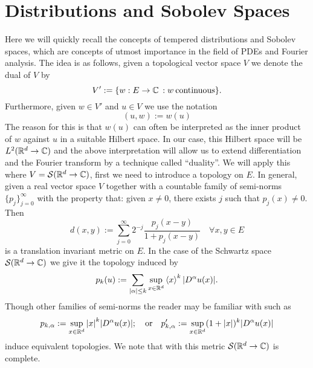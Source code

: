 \documentclass[12pt]{article}
\newcommand{\br}[1]{\left\langle#1\right\rangle}
\begin{document}
\section{Distributions and Sobolev Spaces}
Here we will quickly recall the concepts of tempered distributions and Sobolev spaces, which are concepts of utmost importance in the field of PDEs and Fourier analysis.
The idea is as follows, given a topological vector space $V$ we denote the dual of $V$  by \[V':=\lbrace w:E\to\mathbb{C}\hspace{2pt}: w \hspace{2pt}\text{continuous}\rbrace.\]
Furthermore, given $w\in V'$ and $u\in V$ we use the notation
\begin{equation*}
	(u,w):=w(u)
\end{equation*}
The reason for this is that $w(u)$ can often be interpreted as the inner product of $w$ against $u$ in a suitable Hilbert space. In our case, this Hilbert space will be $L^2({\mathbb R}^d\to\mathbb{C})$ and the above interpretation will allow us to extend differentiation and the Fourier transform by a technique called ``duality''.
\bigbreak  We will apply this where $V={\mathcal S}({\mathbb R}^d\to\mathbb{C})$, first we need to introduce a topology on $E$.
In general, given a real vector space $V$ together with a countable family of semi-norms $\lbrace p_j\rbrace_{j=0}^\infty$ with the property that: given $x\neq 0$, there exists $j$ such that $p_j(x)\neq 0$. Then
\begin{equation}\label{seminormsgivemetric}
	d(x,y):=\sum_{j=0}^\infty 2^{-j}\frac{p_j(x-y)}{1+p_j(x-y)}\quad \forall{x,y}\in {E}
\end{equation}
is a translation invariant metric on $E$. In the case of the Schwartz space ${\mathcal S}({\mathbb R}^d\to\mathbb{C})$ we give it the topology induced by
\begin{equation}\label{seminornormsSchwartz}
	p_k(u):=\sum_{\abs{\alpha}\leq k} \sup_{x\in\R^d}\br{x}^k \abs{D^\alpha u(x)}.
\end{equation}
Though other families of semi-norms the reader may be familiar with such as
\[p_{k,\alpha}:=\sup_{x\in{\mathbb R}^d}\abs{x}^k \abs{D^\alpha u(x)};\quad\text{or}\quad p'_{k,\alpha}:=\sup_{x\in{\mathbb R}^d}(1+\abs{x})^k \abs{D^\alpha u(x)}\]
induce equivalent topologies. We note that with this metric ${\mathcal S}({\mathbb R}^d\to\mathbb{C})$ is complete.
\end{document}
